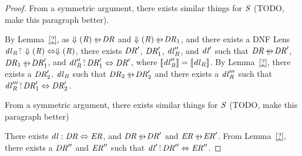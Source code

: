 \documentclass[numbers]{sigplanconf}
\begin{document}
\begin{proof}
  From a symmetric argument, there exists similar things for $\mathit{S}$ (TODO,
  make this paragraph better).

  By Lemma~\ref{?}, as $\ToDNFRegexOf{\Regex}\RewritesTo\DNFRegex$ and
  $\ToDNFRegexOf{\Regex}\RewritesTo\DNFRegex_1$, and there exists a DNF Lens
  $\mathit{dl}_{\mathit{R}} \,\tilde{:}\, \Downarrow(\mathit{R}) \Leftrightarrow
  \Downarrow(\mathit{R})$, there exists $\mathit{DR}'$, $\mathit{DR}_1'$,
  $\mathit{dl}_{\mathit{R}}''$, and $\mathit{dl}'$ such that
  $\DNFRegex \RewritesTo \DNFRegex'$, $\DNFRegex_1 \RewritesTo \DNFRegex_1'$,
  and $\mathit{dl}_{\mathit{R}}'' \,\tilde{:}\, \mathit{DR}_1' \Leftrightarrow
  \mathit{DR}'$, where $[ \! [\mathit{dl}_{\mathit{R}}''] \! ] =
  [ \! [\mathit{dl}_{\mathit{R}}] \! ]$.  By Lemma~\ref{?}, there exists a
  $\mathit{DR}_2'$, $\mathit{dl}_{\mathit{R}}$ such that $\DNFRegex_2 \RewritesTo
  \DNFRegex_2'$ and there exists a $\mathit{dl}_{\mathit{R}}'''$ such that
  $\mathit{dl}_{\mathit{R}}''' \,\tilde{:}\, \mathit{DR}_1' \Leftrightarrow
  \mathit{DR}_2'$.
  
  From a symmetric argument, there exists similar things for $\mathit{S}$ (TODO,
  make this paragraph better)

  There exists $\mathit{dl} : \mathit{DR} \Leftrightarrow \mathit{ER}$, and
  $\DNFRegex \RewritesTo \DNFRegex'$ and $\DNFRegexAlt \RewritesTo
  \DNFRegexAlt'$.  From Lemma~\ref{?}, there exists a $\mathit{DR}''$ and
  $\mathit{ER}''$ such that $\mathit{dl}' \,\tilde{:}\, \mathit{DR}'' \Leftrightarrow
  \mathit{ER}''$.
  

\end{proof}


\end{document}

